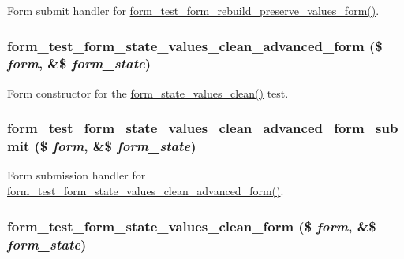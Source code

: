 \label{form__test_8module_a033fef384d76554268bbf52c2098b7ed}
Form submit handler for \hyperlink{form__test_8module_a8110b3241d2e10fb9a9b650c4f2884c3}{form\_\-test\_\-form\_\-rebuild\_\-preserve\_\-values\_\-form()}. \hypertarget{form__test_8module_a1f07ce9c1e970f02390ef3af042dcd3c}{
\subsubsection[{form\_\-test\_\-form\_\-state\_\-values\_\-clean\_\-advanced\_\-form}]{\setlength{\rightskip}{0pt plus 5cm}form\_\-test\_\-form\_\-state\_\-values\_\-clean\_\-advanced\_\-form (\$ {\em form}, \/  \&\$ {\em form\_\-state})}}
\label{form__test_8module_a1f07ce9c1e970f02390ef3af042dcd3c}
Form constructor for the \hyperlink{group__form__api_ga012a73101cc9e2bfbb9e9a41c4e0a723}{form\_\-state\_\-values\_\-clean()} test. \hypertarget{form__test_8module_a4eb7997d96360631e23ef8956dd00f15}{
\subsubsection[{form\_\-test\_\-form\_\-state\_\-values\_\-clean\_\-advanced\_\-form\_\-submit}]{\setlength{\rightskip}{0pt plus 5cm}form\_\-test\_\-form\_\-state\_\-values\_\-clean\_\-advanced\_\-form\_\-submit (\$ {\em form}, \/  \&\$ {\em form\_\-state})}}
\label{form__test_8module_a4eb7997d96360631e23ef8956dd00f15}
Form submission handler for \hyperlink{form__test_8module_a1f07ce9c1e970f02390ef3af042dcd3c}{form\_\-test\_\-form\_\-state\_\-values\_\-clean\_\-advanced\_\-form()}. \hypertarget{form__test_8module_ae4876c1eeb47a238a8069cb7f4e5e3f2}{
\subsubsection[{form\_\-test\_\-form\_\-state\_\-values\_\-clean\_\-form}]{\setlength{\rightskip}{0pt plus 5cm}form\_\-test\_\-form\_\-state\_\-values\_\-clean\_\-form (\$ {\em form}, \/  \&\$ {\em form\_\-state})}}
